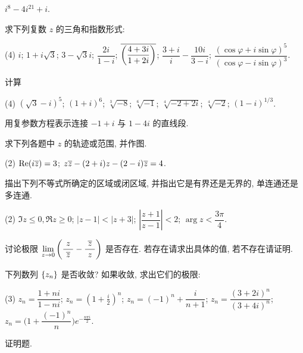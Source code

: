 \begin{homework}
\begin{exlist}
\begin{tasks}
          \task $i^8-4i^{21}+i$.
        \end{tasks}
      \item 求下列复数 $z$ 的三角和指数形式:
        \begin{tasks}(4)
          \task $i$;
          \task $1+i\sqrt3$;
          \task $3-\sqrt 3i$;
          \task $\dfrac{2i}{1-i}$;
          \task $\overline{\biggl(\dfrac{4+3i}{1+2i}\biggr)}$;
          \task $\dfrac{3+i}{i}-\dfrac{10i}{3-i}$;
          \task $\dfrac{(\cos \varphi+i\sin \varphi)^5}{(\cos \varphi-i\sin \varphi)^3}$.
        \end{tasks}
      \item 计算
        \begin{tasks}(4)
          \task $(\sqrt3-i)^5$;
          \task $(1+i)^6$;
          \task $\sqrt[3]{-8}$;
          \task $\sqrt[6]{-1}$;
          \task $\sqrt[4]{-2+2i}$;
          \task $\sqrt[4]{-2}$;
          \task $(1-i)^{1/3}$.
        \end{tasks}
      \item 用复参数方程表示连接 $-1+i$ 与 $1-4i$ 的直线段.
      \item 求下列各题中 $z$ 的轨迹或范围, 并作图.
        \begin{tasks}(2)
          \task $\operatorname{Re}(i\overline z)=3$;
          \task $z\overline z-(2+i)z-(2-i)\overline z=4$.
        \end{tasks}
      \item 描出下列不等式所确定的区域或闭区域, 并指出它是有界还是无界的, 单连通还是多连通.
        \begin{tasks}(2)
          \task $\Im z\le0,\Re z\ge0$;
          \task $|z-1|<|z+3|$;
          \task $\left|\dfrac{z+1}{z-1}\right|<2$;
          \task $\arg z<\dfrac{3\pi}4$.
        \end{tasks}
      \item 讨论极限 $\displaystyle\lim_{z\to0}\left(\frac{z}{~\overline z~}-\frac{~\overline z~}z\right)$ 是否存在. 若存在请求出具体的值, 若不存在请证明.
      \item 下列数列 ${\left\{z_n\right\}}$ 是否收敛? 如果收敛, 求出它们的极限:
        \begin{tasks}(3)
          \task $z_n=\dfrac{1+ni}{1-ni}$;
          \task $\displaystyle z_n=\left(1+\frac i2\right)^n$;
          \task $z_n=(-1)^n+\dfrac{i}{n+1}$;
          \task $z_n=\dfrac{(3+2i)^n}{(3+4i)^n}$;
          \task $z_n=\biggl(1+\dfrac{(-1)^n}n\biggr)e^{-\frac{n\pi i}2}$.
        \end{tasks}
    \end{exlist}
  \item 证明题.

\end{homework}
